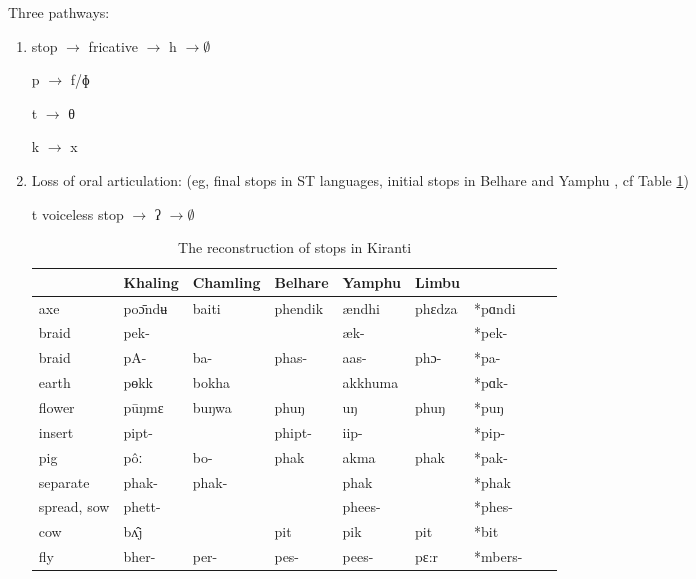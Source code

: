 \documentclass[oldfontcommands,oneside,a4paper,11pt]{article}
\newcommand{\ipa}[1]{{\phon \mbox{#1}}} %
\begin{document}
 Three pathways:
\begin{enumerate}
\item  stop $\rightarrow$  fricative $\rightarrow$ h $\rightarrow \emptyset$ 


  p $\rightarrow$  f/ɸ
  
  
  t $\rightarrow$  θ
  
  k $\rightarrow$  x
 


\item Loss of oral articulation: (eg, final stops in ST languages, initial stops in Belhare and Yamphu \citealt{michailovsky10kiranti}, cf Table \ref{tab:kiranti.stops})

 t voiceless stop $\rightarrow$  ʔ $\rightarrow \emptyset$ 
 

\begin{table}[h]
\caption{The reconstruction of stops in Kiranti} \label{tab:kiranti.stops}
\begin{tabular}{lllllllll}
\toprule
  & 	Khaling  & 	Chamling  & 	Belhare  & 	Yamphu  & 	Limbu  & 	  & 	\\	
  \midrule
axe  & 	\ipa{poɔ̄ndʉ} &	\ipa{baiti} &	\ipa{phendik} &	\ipa{ændhi} &	\ipa{phɛdza} &	\ipa{*pɑndi} &	\\	
braid  & 	\ipa{pek-} &	\ipa{} &	\ipa{} &	\ipa{æk-} &	\ipa{} &	\ipa{*pek-} &	\\	
braid  & 	\ipa{pA-} &	\ipa{ba-} &	\ipa{phas-} &	\ipa{aas-} &	\ipa{phɔ-} &	\ipa{*pa-} &	\\	
earth  & 	\ipa{pɵkk} &	\ipa{bokha} &	\ipa{} &	\ipa{akkhuma} &	\ipa{} &	\ipa{*pɑk-} &	\\	
flower  & 	\ipa{pūŋmɛ} &	\ipa{buŋwa} &	\ipa{phuŋ} &	\ipa{uŋ} &	\ipa{phuŋ} &	\ipa{*puŋ} &	\\	
insert  & 	\ipa{pipt-} &	\ipa{} &	\ipa{phipt-} &	\ipa{iip-} &	\ipa{} &	\ipa{*pip-} &	\\	
pig  & 	\ipa{pôː} &	\ipa{bo-} &	\ipa{phak} &	\ipa{akma} &	\ipa{phak} &	\ipa{*pak-} &	\\	
  \midrule
separate  & 	\ipa{phak-} &	\ipa{phak-} &	\ipa{} &	\ipa{phak} &	\ipa{} &	\ipa{*phak} &	\\	
spread, sow  & 	\ipa{phett-} &	\ipa{} &	\ipa{} &	\ipa{phees-} &	\ipa{} &	\ipa{*phes-} &	\\	
  \midrule
cow  & 	\ipa{bʌ̂j} &	\ipa{} &	\ipa{pit} &	\ipa{pik} &	\ipa{pit} &	\ipa{*bit} &	\\	
fly  & 	\ipa{bher-} &	\ipa{per-} &	\ipa{pes-} &	\ipa{pees-} &	\ipa{pɛ:r} &	\ipa{*mbers-} &	\\	

\end{tabular}
\end{table}
\end{enumerate}
\end{document}
